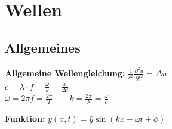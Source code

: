 \documentclass[german]{latex4ei/latex4ei_sheet}
\begin{document}
\section{Wellen}
\begin{sectionbox}
\subsection{Allgemeines}
\textbf{Allgemeine Wellengleichung:} $\frac{1}{c^2}\frac{\partial^2u}{\partial t^2}=\Delta u$\\
$c=\lambda \cdot f=\frac{\omega}{k}=\frac{x}{\Delta t}$\\
$\omega = 2\pi f=\frac{2\pi}{T} \qquad k=\frac{2\pi}{\lambda}=\frac{\omega}{c}$\\
\begin{emphbox}
\textbf{Funktion:} $y(x,t)=\hat{y}\sin(kx - \omega t + \phi)$
\end{emphbox}
\end{sectionbox}
\end{document}
